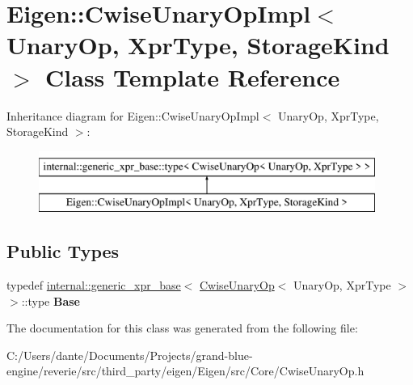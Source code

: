 \hypertarget{class_eigen_1_1_cwise_unary_op_impl}{}\section{Eigen\+::Cwise\+Unary\+Op\+Impl$<$ Unary\+Op, Xpr\+Type, Storage\+Kind $>$ Class Template Reference}
\label{class_eigen_1_1_cwise_unary_op_impl}
Inheritance diagram for Eigen\+::Cwise\+Unary\+Op\+Impl$<$ Unary\+Op, Xpr\+Type, Storage\+Kind $>$\+:\begin{figure}[H]
\begin{center}
\leavevmode
\includegraphics[height=2.000000cm]{class_eigen_1_1_cwise_unary_op_impl}
\end{center}
\end{figure}
\subsection*{Public Types}
\begin{DoxyCompactItemize}
\item 
\mbox{\label{class_eigen_1_1_cwise_unary_op_impl_a79822924cef6e029d7e25cb05c3c3e6f}} 
typedef \mbox{\hyperlink{struct_eigen_1_1internal_1_1generic__xpr__base}{internal\+::generic\+\_\+xpr\+\_\+base}}$<$ \mbox{\hyperlink{class_eigen_1_1_cwise_unary_op}{Cwise\+Unary\+Op}}$<$ Unary\+Op, Xpr\+Type $>$ $>$\+::type {\bfseries Base}
\end{DoxyCompactItemize}


The documentation for this class was generated from the following file\+:\begin{DoxyCompactItemize}
\item 
C\+:/\+Users/dante/\+Documents/\+Projects/grand-\/blue-\/engine/reverie/src/third\+\_\+party/eigen/\+Eigen/src/\+Core/Cwise\+Unary\+Op.\+h\end{DoxyCompactItemize}

